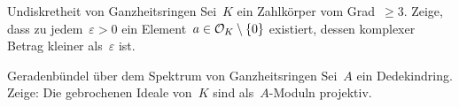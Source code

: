 \documentclass{uebblatt}
\begin{document}
\begin{aufgabe}{Undiskretheit von Ganzheitsringen}
Sei~$K$ ein Zahlkörper vom Grad~$\geq 3$. Zeige, dass zu jedem~$\varepsilon >
0$ ein Element~$a \in \mathcal{O}_K \setminus \{0\}$ existiert, dessen komplexer Betrag
kleiner als~$\varepsilon$ ist.
\end{aufgabe}

\begin{aufgabe*}{Geradenbündel über dem Spektrum von Ganzheitsringen}
Sei~$A$ ein Dedekindring. Zeige: Die gebrochenen Ideale von~$K$ sind
als~$A$-Moduln projektiv.
\end{aufgabe*}
\end{document}
